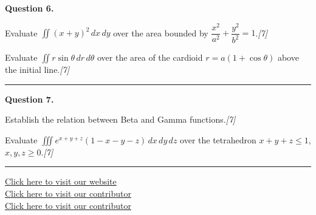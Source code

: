 \documentclass[11pt,a4paper]{article}
\newcommand{\pts}[1]{\hfill   \textit{[#1]}}
\begin{document}
\medskip


\noindent   \textbf{Question 6.}

\begin{parts}
  \item Evaluate $\displaystyle\iint(x+y)^2\,dx\,dy$ over the area bounded by $\dfrac{x^2}{a^2}+\dfrac{y^2}{b^2}=1$.\pts{7}
  \item Evaluate $\displaystyle\iint r\sin \theta\,dr\,d \theta$ over the area of the cardioid $r=a(1+\cos \theta)$ above the initial line.\pts{7}
\end{parts}
\medskip\rule{\linewidth}{0.2pt}

\medskip


\noindent   \textbf{Question 7.}

\begin{parts}
  \item Establish the relation between Beta and Gamma functions.\pts{7}
  \item Evaluate $\displaystyle\iiint e^{x+y+z}(1-x-y-z)\,dx\,dy\,dz$ over the tetrahedron $x+y+z\leq1$, $x,y,z\geq0$.\pts{7}
\end{parts}

\vfill\rule{\linewidth}{0.4pt}

\begin{center}\small
\href{https://bhu-exam.vercel.app/}{Click here to visit our website}\\[4pt]
\href{https://me-aryan.vercel.app/}{Click here to visit our contributor}\\[4pt]
\href{https://quashan-me.vercel.app/}{Click here to visit our contributor}
\end{center}
\end{document}
